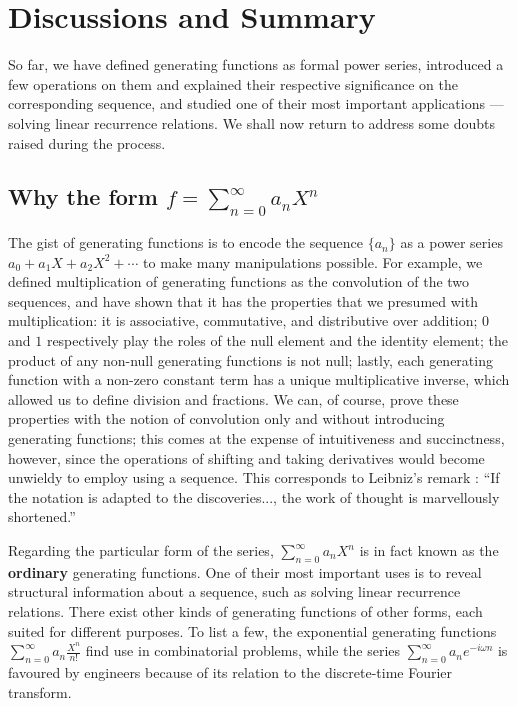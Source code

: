 \documentclass[a4paper, 12pt]{report}
\begin{document}
{\let\clearpage\relax\chapter{Discussions and Summary}\label{ch:conclusion}}
% 

So far, we have defined generating functions as formal power series, introduced a few operations on them and explained their respective significance on the corresponding sequence, and studied one of their most important applications --- solving linear recurrence relations. We shall now return to address some doubts raised during the process.

\section{Why the form \texorpdfstring{$f = \sum_{n = 0}^\infty a_n X^n$}}

The gist of generating functions is to encode the sequence $\{a_n\}$ as a power series $a_0 + a_1 X + a_2 X^2 + \cdots$ to make many manipulations possible. For example, we defined multiplication of generating functions as the convolution of the two sequences, and have shown that it has the properties that we presumed with multiplication: it is associative, commutative, and distributive over addition; $0$ and $1$ respectively play the roles of the null element and the identity element; the product of any non-null generating functions is not null; lastly, each generating function with a non-zero constant term has a unique multiplicative inverse, which allowed us to define division and fractions. We can, of course, prove these properties with the notion of convolution only and without introducing generating functions; this comes at the expense of intuitiveness and succinctness, however, since the operations of shifting and taking derivatives would become unwieldy to employ using a sequence. This corresponds to Leibniz's remark \autocite[1]{zorich}: ``If the notation is adapted to the discoveries..., the work of thought is marvellously shortened.'' 

Regarding the particular form of the series, $\sum_{n = 0}^\infty a_n X^n$ is in fact known as the \textbf{ordinary} generating functions. One of their most important uses is to reveal structural information about a sequence, such as solving linear recurrence relations. There exist other kinds of generating functions of other forms, each suited for different purposes. To list a few, the exponential generating functions $\sum_{n = 0}^\infty a_n \frac{X^n}{n!}$ find use in combinatorial problems, while the series $\sum_{n = 0}^\infty a_n e^{-i\omega n}$ is favoured by engineers because of its relation to the discrete-time Fourier transform.
\end{document}
